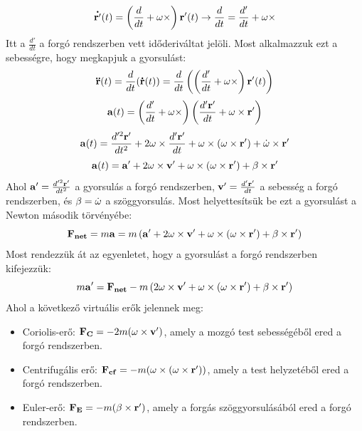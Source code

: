 \documentclass[a4paper,12pt]{article}
\begin{document}
\begin{equation}
    \bold{\dot{r'}}(t) = \left(\frac{d}{dt} + \bold{\omega} \times \right)\bold{r'}(t) \rightarrow \frac{d}{dt} = \frac{d'}{dt} + \bold{\omega} \times
\end{equation}
Itt a $\frac{d'}{dt}$ a forgó rendszerben vett időderiváltat jelöli. Most alkalmazzuk ezt a sebességre, hogy megkapjuk a gyorsulást:
\begin{equation}
    \bold{\ddot{r}}(t) = \frac{d}{dt}(\bold{\dot{r}}(t)) = \frac{d}{dt}\left(\left(\frac{d'}{dt} + \bold{\omega} \times \right)\bold{r'}(t)\right)
\end{equation}
\begin{equation}
    \bold{a}(t) = \left(\frac{d'}{dt} + \bold{\omega} \times \right)\left(\frac{d'\bold{r'}}{dt} + \bold{\omega} \times \bold{r'} \right)
\end{equation}
\begin{equation}
    \bold{a}(t) = \frac{d'^2\bold{r'}}{dt^2} + 2\bold{\omega} \times \frac{d'\bold{r'}}{dt} + \bold{\omega} \times (\bold{\omega} \times \bold{r'}) + \dot{\bold{\omega}} \times \bold{r'}
\end{equation}
\begin{equation}
    \bold{a}(t) = \bold{a'} + 2\bold{\omega} \times \bold{v'} + \bold{\omega} \times (\bold{\omega} \times \bold{r'}) + \bold{\beta} \times \bold{r'}
\end{equation}
Ahol $\bold{a'} = \frac{d'^2\bold{r'}}{dt^2}$ a gyorsulás a forgó rendszerben, $\bold{v'} = \frac{d'\bold{r'}}{dt}$ a sebesség a forgó rendszerben, és $\bold{\beta} = \dot{\bold{\omega}}$ a szöggyorsulás. Most helyettesítsük be ezt a gyorsulást a Newton második törvényébe:
\begin{equation}
    \bold{F_{net}} = m\bold{a} = m\left(\bold{a'} + 2\bold{\omega} \times \bold{v'} + \bold{\omega} \times (\bold{\omega} \times \bold{r'}) + \bold{\beta} \times \bold{r'}\right)
\end{equation}
Most rendezzük át az egyenletet, hogy a gyorsulást a forgó rendszerben kifejezzük:
\begin{equation}
    m\bold{a'} = \bold{F_{net}} - m\left(2\bold{\omega} \times \bold{v'} + \bold{\omega} \times (\bold{\omega} \times \bold{r'}) + \bold{\beta} \times \bold{r'}\right)
\end{equation}
Ahol a következő virtuális erők jelennek meg:
\begin{itemize}
    \item Coriolis-erő: $\bold{F_{C}} = -2m(\bold{\omega} \times \bold{v'})$, amely a mozgó test sebességéből ered a forgó rendszerben.
    \item Centrifugális erő: $\bold{F_{cf}} = -m(\bold{\omega} \times (\bold{\omega} \times \bold{r'}))$, amely a test helyzetéből ered a forgó rendszerben.
    \item Euler-erő: $\bold{F_{E}} = -m(\bold{\beta} \times \bold{r'})$, amely a forgás szöggyorsulásából ered a forgó rendszerben.
\end{itemize}
\end{document}
